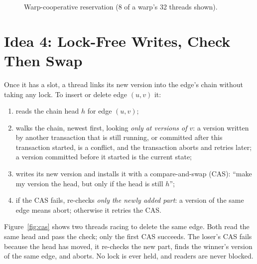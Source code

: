 \documentclass[11pt,a4paper,oneside]{report}
\begin{document}
\begin{figure}[H]
\centering
{}
\caption{Warp-cooperative reservation (8 of a warp's 32 threads shown).}
\label{fig:resv}
\end{figure}

\section{Idea 4: Lock-Free Writes, Check Then Swap}
Once it has a slot, a thread links its new version into the edge's chain without taking any lock. To insert or delete
edge $(u,v)$ it:
\begin{enumerate}
\item reads the chain head $h$ for edge $(u,v)$;
\item walks the chain, newest first, looking \emph{only at versions of $v$}: a version written by another transaction
  that is still running, or committed after this transaction started, is a conflict, and the transaction aborts and
  retries later; a version committed before it started is the current state;
\item writes its new version and installs it with a compare-and-swap (CAS): ``make my version the head, but only if the
  head is still $h$'';
\item if the CAS fails, re-checks \emph{only the newly added part}: a version of the same edge means abort; otherwise it
  retries the CAS.
\end{enumerate}

Figure~\ref{fig:cas} shows two threads racing to delete the same edge. Both read the same head and pass the check; only
the first CAS succeeds. The loser's CAS fails because the head has moved, it re-checks the new part, finds the winner's
version of the same edge, and aborts. No lock is ever held, and readers are never blocked.
\end{document}
